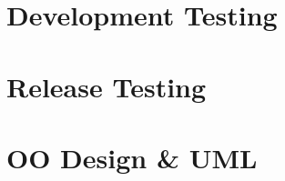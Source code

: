 \documentclass[10pt]{article}
\begin{document}
\newpage
\section{Development Testing}

\newpage
\section{Release Testing}

\newpage
\section{OO Design \& UML}
\end{document}
